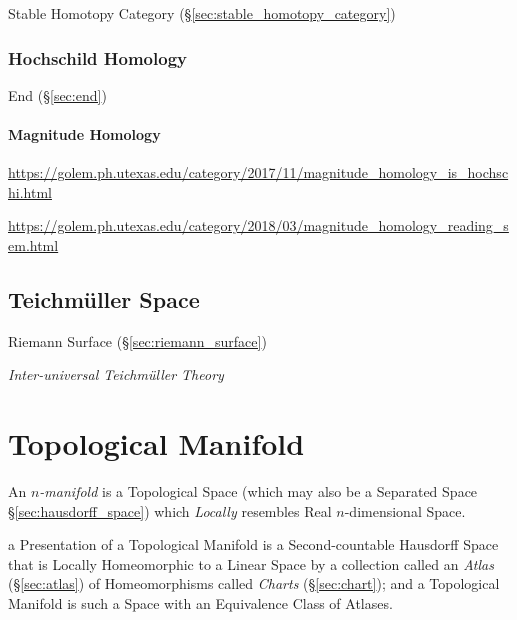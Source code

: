 Stable Homotopy Category (\S\ref{sec:stable_homotopy_category})



\subsubsection{Hochschild Homology}\label{sec:hochschild_homology}

End (\S\ref{sec:end})



\paragraph{Magnitude Homology}\label{sec:magnitude_homology}\hfill

\url{https://golem.ph.utexas.edu/category/2017/11/magnitude_homology_is_hochschi.html}

\url{https://golem.ph.utexas.edu/category/2018/03/magnitude_homology_reading_sem.html}



\subsection{Teichm\"uller Space}\label{sec:teichmuller_space}

Riemann Surface (\S\ref{sec:riemann_surface})

\emph{Inter-universal Teichm\"uller Theory} %



\section{Topological Manifold}\label{sec:topological_manifold}

An \emph{$n$-manifold} is a Topological Space (which may also be a Separated
Space \S\ref{sec:hausdorff_space}) which \emph{Locally} resembles Real
$n$-dimensional Space.

a Presentation of a Topological Manifold is a Second-countable Hausdorff Space
that is Locally Homeomorphic to a Linear Space by a collection called an
\emph{Atlas} (\S\ref{sec:atlas}) of Homeomorphisms called \emph{Charts}
(\S\ref{sec:chart}); and a Topological Manifold is such a Space with an
Equivalence Class of Atlases.

